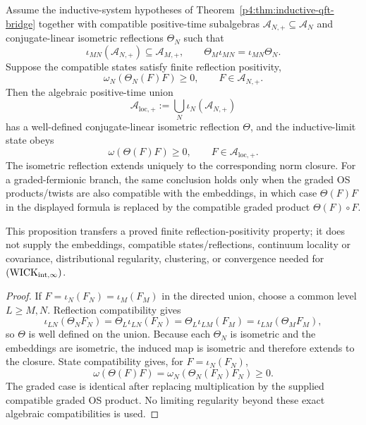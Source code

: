 \documentclass[12pt,a4paper]{article}
\begin{document}
\begin{proposition}
\label{p4:prop:inductive-reflection-positivity-inheritance}
Assume the inductive-system hypotheses of
Theorem~\ref{p4:thm:inductive-qft-bridge} together with compatible
positive-time subalgebras \(\mathcal A_{N,+}\subseteq\mathcal A_N\) and
conjugate-linear isometric reflections \(\Theta_N\) such that
\[
 \iota_{MN}(\mathcal A_{N,+})\subseteq\mathcal A_{M,+},
 \qquad
 \Theta_M\iota_{MN}=\iota_{MN}\Theta_N.
\]
Suppose the compatible states satisfy finite reflection positivity,
\[
 \omega_N\!\left(\Theta_N(F)F\right)\ge0,
 \qquad F\in\mathcal A_{N,+}.
\]
Then the algebraic positive-time union
\[
 \mathcal A_{\mathrm{loc},+}
 :=\bigcup_N\iota_N(\mathcal A_{N,+})
\]
has a well-defined conjugate-linear isometric reflection \(\Theta\), and the
inductive-limit state obeys
\begin{equation}
\label{p4:eq:inductive-os-inheritance}
 \boxed{
 \omega\!\left(\Theta(F)F\right)\ge0,
 \qquad F\in\mathcal A_{\mathrm{loc},+}.}
\end{equation}
The isometric reflection extends uniquely to the corresponding norm closure.
For a graded-fermionic branch, the same conclusion holds only when the graded
OS products/twists are also compatible with the embeddings, in which case
\(\Theta(F)F\) in the displayed formula is replaced by the compatible graded
product \(\Theta(F)\circ F\).

This proposition transfers a proved finite reflection-positivity property; it
does not supply the embeddings, compatible states/reflections, continuum
locality or covariance, distributional regularity, clustering, or convergence
needed for \((\mathrm{WICK}_{\rm int,\infty})\).
\end{proposition}

\begin{proof}
If \(F=\iota_N(F_N)=\iota_M(F_M)\) in the directed union, choose a common
level \(L\ge M,N\).  Reflection compatibility gives
\[
 \iota_{LN}(\Theta_NF_N)
 =\Theta_L\iota_{LN}(F_N)
 =\Theta_L\iota_{LM}(F_M)
 =\iota_{LM}(\Theta_MF_M),
\]
so \(\Theta\) is well defined on the union.  Because each \(\Theta_N\) is
isometric and the embeddings are isometric, the induced map is isometric and
therefore extends to the closure.  State compatibility gives, for
\(F=\iota_N(F_N)\),
\[
 \omega(\Theta(F)F)
 =\omega_N(\Theta_N(F_N)F_N)\ge0.
\]
The graded case is identical after replacing multiplication by the supplied
compatible graded OS product.  No limiting regularity beyond these exact
algebraic compatibilities is used.
\end{proof}
\end{document}
